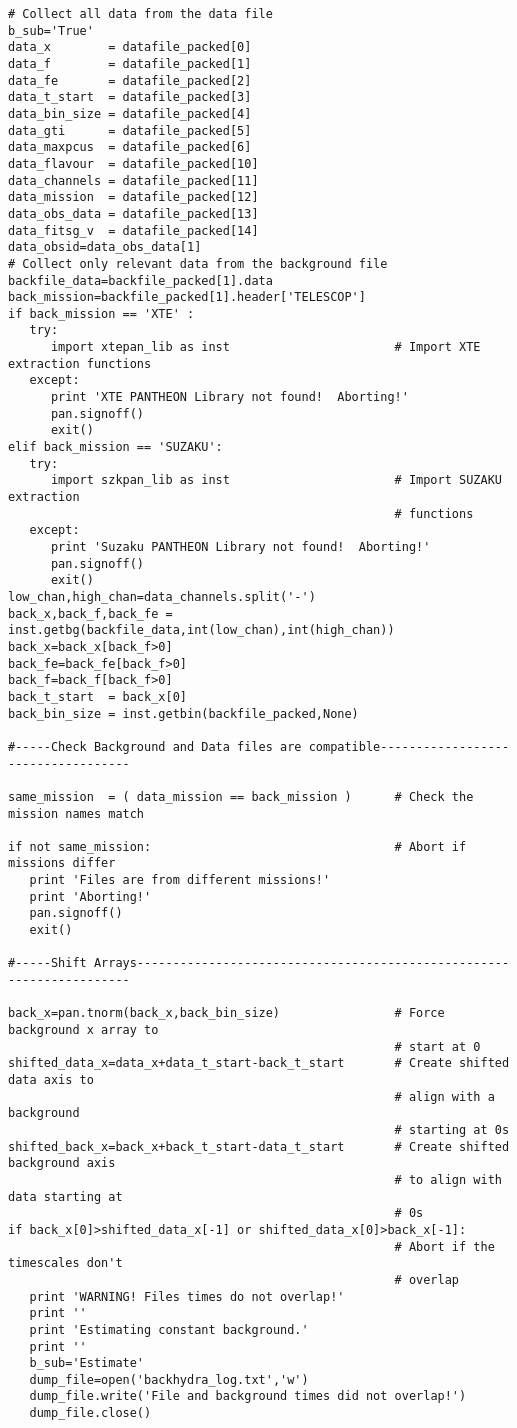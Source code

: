 \begin{verbatim}
# Collect all data from the data file
b_sub='True'
data_x        = datafile_packed[0]
data_f        = datafile_packed[1]
data_fe       = datafile_packed[2]
data_t_start  = datafile_packed[3]
data_bin_size = datafile_packed[4]
data_gti      = datafile_packed[5]
data_maxpcus  = datafile_packed[6]
data_flavour  = datafile_packed[10]
data_channels = datafile_packed[11]
data_mission  = datafile_packed[12]
data_obs_data = datafile_packed[13]
data_fitsg_v  = datafile_packed[14]
data_obsid=data_obs_data[1]
# Collect only relevant data from the background file
backfile_data=backfile_packed[1].data
back_mission=backfile_packed[1].header['TELESCOP']
if back_mission == 'XTE' :
   try:
      import xtepan_lib as inst                       # Import XTE extraction functions
   except:
      print 'XTE PANTHEON Library not found!  Aborting!'
      pan.signoff()
      exit()
elif back_mission == 'SUZAKU':
   try:
      import szkpan_lib as inst                       # Import SUZAKU extraction
                                                      # functions
   except:
      print 'Suzaku PANTHEON Library not found!  Aborting!'
      pan.signoff()
      exit()
low_chan,high_chan=data_channels.split('-')
back_x,back_f,back_fe = inst.getbg(backfile_data,int(low_chan),int(high_chan))
back_x=back_x[back_f>0]
back_fe=back_fe[back_f>0]
back_f=back_f[back_f>0]
back_t_start  = back_x[0]
back_bin_size = inst.getbin(backfile_packed,None)

#-----Check Background and Data files are compatible-----------------------------------

same_mission  = ( data_mission == back_mission )      # Check the mission names match

if not same_mission:                                  # Abort if missions differ
   print 'Files are from different missions!'
   print 'Aborting!'
   pan.signoff()
   exit()

#-----Shift Arrays---------------------------------------------------------------------

back_x=pan.tnorm(back_x,back_bin_size)                # Force background x array to
                                                      # start at 0
shifted_data_x=data_x+data_t_start-back_t_start       # Create shifted data axis to
                                                      # align with a background
                                                      # starting at 0s
shifted_back_x=back_x+back_t_start-data_t_start       # Create shifted background axis
                                                      # to align with data starting at
                                                      # 0s
if back_x[0]>shifted_data_x[-1] or shifted_data_x[0]>back_x[-1]:
                                                      # Abort if the timescales don't
                                                      # overlap
   print 'WARNING! Files times do not overlap!'
   print ''
   print 'Estimating constant background.'
   print ''
   b_sub='Estimate'
   dump_file=open('backhydra_log.txt','w')
   dump_file.write('File and background times did not overlap!')
   dump_file.close()


\end{verbatim}
